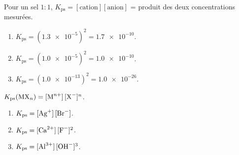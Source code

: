 \documentclass[11pt,a4paper]{article}
\begin{document}
\begin{corrige}
Pour un sel $1{:}1$, $K_{\mathrm{ps}} = [\text{cation}][\text{anion}]$ = produit des deux
concentrations mesurées.
\begin{enumerate}[label=\alph*)]
  \item $K_{\mathrm{ps}} = (\num{1.3e-5})^{2} = \num{1.7e-10}$.
  \item $K_{\mathrm{ps}} = (\num{1.0e-5})^{2} = \num{1.0e-10}$.
  \item $K_{\mathrm{ps}} = (\num{1.0e-13})^{2} = \num{1.0e-26}$.
\end{enumerate}
\end{corrige}

\begin{corrige}
$K_{\mathrm{ps}}(\mathrm{MX}_n) = [\ce{M^{n+}}]\,[\ce{X-}]^{n}$.
\begin{enumerate}[label=\alph*)]
  \item $K_{\mathrm{ps}} = [\ce{Ag+}]\,[\ce{Br-}]$.
  \item $K_{\mathrm{ps}} = [\ce{Ca^{2+}}]\,[\ce{F-}]^{2}$.
  \item $K_{\mathrm{ps}} = [\ce{Al^{3+}}]\,[\ce{OH-}]^{3}$.
\end{enumerate}
\end{corrige}
\end{document}
